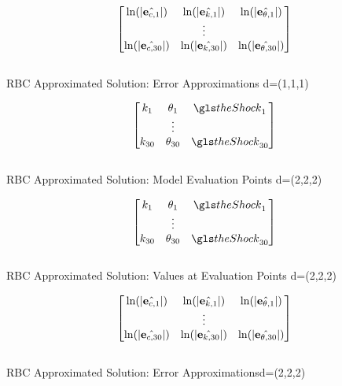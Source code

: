 \documentclass[12pt]{article}
\begin{document}
 \begin{table}
   \centering
  
   \begin{gather*}
\forEstErr
\\
%   
   \end{gather*}\\
   \caption{RBC Approximated Solution: Error Approximations\label{esterrunkA} d=(1,1,1)}
 \end{table}


\begin{table}
  \centering
  
\begin{gather*}
  \begin{bmatrix}
    k_1&\theta_1&\theShock_1\\
&\vdots\\
    k_{30}&\theta_{30}&\theShock_{30}\\
  \end{bmatrix}\\
%  
\end{gather*}\\
  \caption{RBC Approximated Solution: Model Evaluation Points \label{evalpunkB} d=(2,2,2)}
\end{table}

\begin{table}
  \centering
  
\begin{gather*}
  \begin{bmatrix}
    k_1&\theta_1&\theShock_1\\
&\vdots\\
    k_{30}&\theta_{30}&\theShock_{30}\\
  \end{bmatrix}\\
%  
\end{gather*}\\
  \caption{RBC Approximated Solution: Values at Evaluation Points \label{valatunkB}d=(2,2,2)}
\end{table}



 \begin{table}
   \centering
  
   \begin{gather*}
\forEstErr\\
%   
   \end{gather*}\\
   \caption{RBC Approximated Solution: Error Approximations\label{esterrunkB}d=(2,2,2)}
 \end{table}
\end{document}
